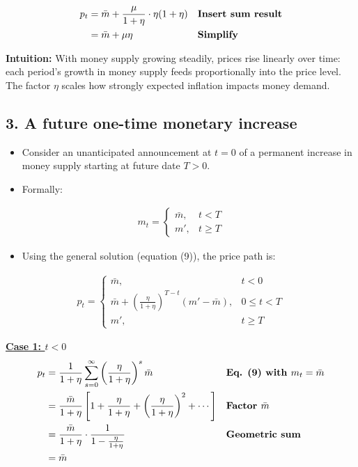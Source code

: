 \documentclass[12pt]{article}
\begin{document}
\singlespacing
\begin{align}
p_t &= \bar m + \frac{\mu}{1+\eta} \cdot \eta(1+\eta) && \text{\textbf{Insert sum result}} \\
    &= \bar m + \mu \eta && \text{\textbf{Simplify}} 
\end{align}

\textbf{Intuition:} With money supply growing steadily, prices rise linearly over time: each period’s growth in money supply feeds proportionally into the price level. The factor $\eta$ scales how strongly expected inflation impacts money demand.

\subsection*{\noindent\textbf{3. A future one-time monetary increase}}

\begin{itemize}
    \item Consider an unanticipated announcement at $t=0$ of a permanent increase in money supply starting at future date $T>0$.  
    \item Formally:
\end{itemize}

\singlespacing
\begin{align}
m_t = 
\begin{cases} 
\bar{m}, & t < T \\
m', & t \geq T
\end{cases}
\end{align}

\begin{itemize}
    \item Using the general solution (equation (9)), the price path is:  
\end{itemize}

\singlespacing
\begin{align}
p_t = 
\begin{cases} 
\bar m, & t < 0 \\
\bar m + \left(\tfrac{\eta}{1+\eta}\right)^{T-t}(m' - \bar m), & 0 \leq t < T \\
m', & t \geq T
\end{cases}
\end{align}

\noindent\underline{\textbf{Case 1: $t < 0$}} \\[4pt]

\singlespacing
\begin{align}
p_t &= \frac{1}{1+\eta} \sum_{s=0}^\infty \left(\frac{\eta}{1+\eta}\right)^s \bar m && \text{\textbf{Eq. (9) with $m_t=\bar m$}} \\
    &= \frac{\bar m}{1+\eta} \left[ 1 + \frac{\eta}{1+\eta} + \left(\frac{\eta}{1+\eta}\right)^2 + \cdots \right] && \text{\textbf{Factor $\bar m$}} \\
    &= \frac{\bar m}{1+\eta} \cdot \frac{1}{1 - \frac{\eta}{1+\eta}} && \text{\textbf{Geometric sum}} \\
    &= \bar m
\end{align}
\end{document}
